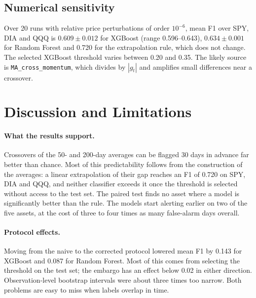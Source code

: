 \documentclass[11pt,a4paper]{article}
\begin{document}
\subsection{Numerical sensitivity}\label{sec:sensitivity}

Over 20 runs with relative price perturbations of order $10^{-6}$, mean F1 over SPY, DIA and QQQ
is $0.609\pm0.012$ for XGBoost (range 0.596--0.643), $0.634\pm0.001$ for Random Forest and
0.720 for the extrapolation rule, which does not change. The selected XGBoost threshold varies
between 0.20 and 0.35. The likely source is \texttt{MA\_cross\_momentum}, which divides by
$|g_t|$ and amplifies small differences near a crossover.

\section{Discussion and Limitations}\label{sec:discussion}

\paragraph{What the results support.} Crossovers of the 50- and 200-day averages can be flagged
30 days in advance far better than chance. Most of this predictability follows from the
construction of the averages: a linear extrapolation of their gap reaches an F1 of 0.720 on SPY,
DIA and QQQ, and neither classifier exceeds it once the threshold is selected without access to
the test set. The paired test finds no asset where a model is significantly better than the rule.
The models start alerting earlier on two of the five assets, at the cost of three to four times
as many false-alarm days overall.

\paragraph{Protocol effects.} Moving from the naive to the corrected protocol lowered mean F1 by
0.143 for XGBoost and 0.087 for Random Forest. Most of this comes from selecting the threshold on
the test set; the embargo has an effect below 0.02 in either direction. Observation-level bootstrap
intervals were about three times too narrow. Both problems are easy to miss when labels overlap
in time.
\end{document}
